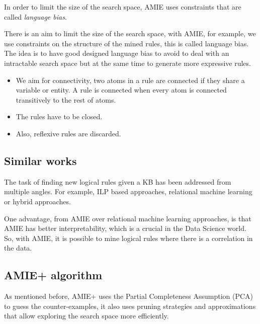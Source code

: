 \documentclass{article}
\begin{document}
In order to limit the size of the search space, AMIE uses constraints that are called
\textit{language bias}.


There is an aim to limit the size of the search space, with AMIE, for example,
we use constraints on the structure of the mined rules, this is called language
bias. The idea is to have good designed language bias to avoid to deal with an
intractable search space but at the same time to generate more expressive rules.

\begin{itemize}
    \item We aim for connectivity, two atoms in a rule are connected if they share a variable or
entity. A rule is connected when every atom is connected transitively to the
rest of atoms.
    \item The rules have to be closed.
    \item Also, reflexive rules are discarded.
\end{itemize}

\subsection{Similar works}

The task of finding new logical rules given a KB has been addressed from
multiple angles. For example, ILP based approaches, relational machine learning
or hybrid approaches.

One advantage, from AMIE over relational machine learning approaches, is that
AMIE has better interpretability, which is a crucial in the Data Science world.
So, with AMIE, it is possible to mine logical rules where there is a
correlation in the data.

\subsection{AMIE+ algorithm}


As mentioned before, AMIE+ uses the Partial Completeness Assumption (PCA) to
guess the counter-examples, it also uses pruning strategies and approximations
that allow exploring the search space more efficiently. 
\end{document}
